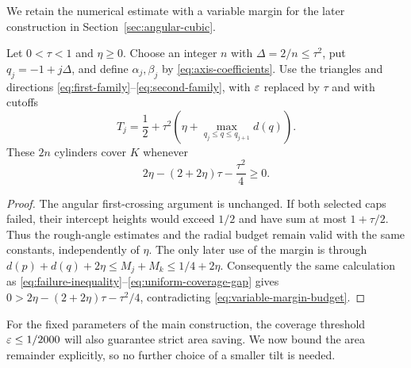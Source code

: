 We retain the numerical estimate with a variable margin for the later
construction in Section~\ref{sec:angular-cubic}.

\begin{corollary}
\label{cor:quantitative-coverage}
Let $0<\tau<1$ and $\eta\ge0$. Choose an integer $n$ with
$\Delta=2/n\le\tau^2$, put $q_j=-1+j\Delta$, and define
$\alpha_j,\beta_j$ by \eqref{eq:axis-coefficients}. Use the triangles and
directions \eqref{eq:first-family}--\eqref{eq:second-family}, with
$\varepsilon$ replaced by $\tau$ and with cutoffs
\[
 T_j=\frac12+\tau^2\left(\eta+\max_{q_j\le q\le q_{j+1}}d(q)\right).
\]
These $2n$ cylinders cover $K$ whenever
\begin{equation}\label{eq:variable-margin-budget}
 2\eta-(2+2\eta)\tau-\frac{\tau^2}{4}\ge0.
\end{equation}
\end{corollary}
\begin{proof}
The angular first-crossing argument is unchanged. If both selected caps
failed, their intercept heights would exceed $1/2$ and have sum at most
$1+\tau/2$. Thus the rough-angle estimates and the radial budget remain
valid with the same constants, independently of $\eta$. The only later
use of the margin is through
$d(p)+d(q)+2\eta\le M_j+M_k\le1/4+2\eta$.
Consequently the same calculation as
\eqref{eq:failure-inequality}--\eqref{eq:uniform-coverage-gap} gives
$0>2\eta-(2+2\eta)\tau-\tau^2/4$, contradicting
\eqref{eq:variable-margin-budget}.
\end{proof}

For the fixed parameters of the main construction, the coverage threshold
$\varepsilon\le1/2000$ will also guarantee strict area saving. We now bound
the area remainder explicitly, so no further choice of a smaller tilt
is needed.
